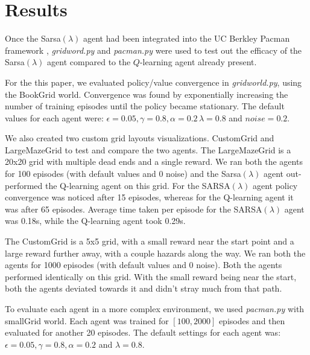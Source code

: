 \documentclass[10pt,conference]{IEEEtran}
\begin{document}
\section{Results}
\label{sec:results}
	
	Once the Sarsa\((\lambda)\) agent had been integrated into
	the UC Berkley Pacman framework \cite{ucbai}, \textit{gridword.py} and 
	\textit{pacman.py} were used to test out the efficacy of the Sarsa\((\lambda)\)
	agent compared to the \(Q\)-learning agent already present.  
	
	For the this paper, we evaluated policy/value convergence in \textit{gridworld.py}, using
	the BookGrid world.  Convergence was found by exponentially increasing the
	number of training episodes until the policy became stationary.  The default
	values for each agent were: \(\epsilon = 0.05, \gamma = 0.8, \alpha = 0.2\,
	\lambda = 0.8\) and \(noise = 0.2\).

	We also created two custom grid layouts visualizations. CustomGrid and LargeMazeGrid to test and compare the two agents. The LargeMazeGrid is a 20x20 grid with multiple dead ends and a single reward. We ran both the agents for 100 episodes (with default values and 0 noise) and the Sarsa\((\lambda)\) agent out-performed the Q-learning agent on this grid. For the SARSA\((\lambda)\) agent policy convergence was noticed after 15 episodes, whereas for the Q-learning agent it was after 65 episodes. Average time taken per episode for the SARSA\((\lambda)\) agent was 0.18s, while the Q-learning agent took 0.29s.

	The CustomGrid is a 5x5 grid, with a small reward near the start point and a large reward further away, with a couple hazards along the way. We ran both the agents for 1000 episodes (with default values and 0 noise). Both the agents performed identically on this grid. With the small reward being near the start, both the agents deviated towards it and didn't stray much from that path. 
	
	To evaluate each agent in a more complex environment, we used 
	\textit{pacman.py} with smallGrid world. Each agent was trained for 
	\([100,2000]\) episodes and then evaluated for another 20 episodes.  The 
	default settings for each agent was: \(\epsilon = 0.05, \gamma = 0.8, 
	\alpha = 0.2\) and \(\lambda = 0.8\).
	
\end{document}
